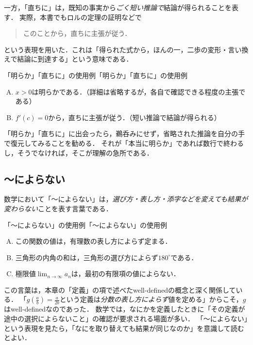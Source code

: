 一方，「直ちに」は，既知の事実から\emph{ごく短い推論で}結論が得られることを表す．
実際，本書でもロルの定理の証明などで
\begin{quote}
  このことから，直ちに主張が従う．
\end{quote}
という表現を用いた．これは「得られた式から，ほんの一，二歩の変形・言い換えで結論に到達する」という意味である．

\begin{example}{「明らか」「直ちに」の使用例}{「明らか」「直ちに」の使用例}
  \begin{enumerate}[(A)]
    \item $x > 0$は明らかである．（詳細は省略するが，各自で確認できる程度の主張である）
    \item $f'(c)=0$から，直ちに主張が従う．（短い推論で結論が得られる）
  \end{enumerate}
\end{example}

「明らか」「直ちに」に出会ったら，鵜呑みにせず，省略された推論を自分の手で復元してみることを勧める．
それが「本当に明らか」であれば数行で終わるし，そうでなければ，そこが理解の急所である．

\subsection{〜によらない}

数学において「〜によらない」は，\emph{選び方・表し方・添字などを変えても結果が変わらない}ことを表す言葉である．

\begin{example}{「〜によらない」の使用例}{「〜によらない」の使用例}
  \begin{enumerate}[(A)]
    \item この関数の値は，有理数の表し方によらず定まる．
    \item 三角形の内角の和は，三角形の選び方によらず$180^\circ$である．
    \item 極限値$\lim_{n \to \infty} a_n$は，最初の有限項の値によらない．
  \end{enumerate}
\end{example}

この言葉は，本章の「定義」の項で述べたwell-definedの概念と深く関係している．
「$g\left(\frac{a}{b}\right)=\frac{a}{2b}$という定義は\emph{分数の表し方によらず}値を定める」からこそ，$g$はwell-definedなのであった．
数学では，なにかを定義したときに「その定義が途中の選択によらないこと」の確認が要求される場面が多い．
「〜によらない」という表現を見たら，「なにを取り替えても結果が同じなのか」を意識して読むとよい．

